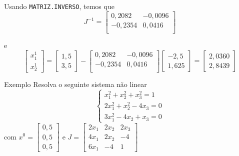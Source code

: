 \begin{frame}[c]
Usando \texttt{MATRIZ.INVERSO}, temos que
\[
J^{-1}=
\begin{bmatrix}
0,2082 &	-0,0096 \\
-0,2354	& 0,0416  \\
\end{bmatrix}
\]

e
\[
\begin{bmatrix}
x_1^1 \\ x_2^1
\end{bmatrix}
=
\begin{bmatrix}
1,5 \\ 3,5
\end{bmatrix}
-
\begin{bmatrix}
0,2082 &	-0,0096 \\
-0,2354	& 0,0416  \\
\end{bmatrix}
\begin{bmatrix}
-2,5 \\
1,625
\end{bmatrix}
=
\begin{bmatrix}
2,0360 \\
2,8439
\end{bmatrix}
\]
\end{frame}

\begin{frame}{Exemplo}
Resolva o seguinte sistema não linear 
\[
\begin{cases}
x_1^2+x_2^2+x_3^2=1 \\
2x_1^2+x_2^2-4x_3=0 \\
3x_1^2-4x_2+x_3=0
\end{cases}
\]
com
\(
x^0=
\begin{bmatrix}
0,5 \\ 0,5 \\ 0,5
\end{bmatrix}
\)
e
\(
J=
\begin{bmatrix}
2x_1 & 2x_2 & 2x_3 \\
4x_1 & 2x_2 & -4 \\
6x_1 & -4 & 1
\end{bmatrix}
\)
\end{frame}



